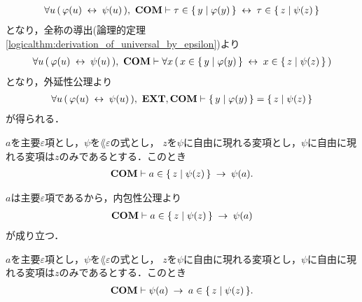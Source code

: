 \begin{sketch}
		\begin{align}
			\forall u\, (\, \varphi(u) \hspace{0.25em}\leftrightarrow\hspace{0.25em} \psi(u)\, ),\ \mbox{\bf COM} \vdash
			\tau \in \{\, y \mid \varphi(y)\, \} \hspace{0.25em}\leftrightarrow\hspace{0.25em} \tau \in \{\, z \mid \psi(z)\, \}
		\end{align}
		となり，全称の導出(論理的定理\ref{logicalthm:derivation_of_universal_by_epsilon})より
		\begin{align}
			\forall u\, (\, \varphi(u) \hspace{0.25em}\leftrightarrow\hspace{0.25em} \psi(u)\, ),\ \mbox{\bf COM} \vdash
			\forall x\, (\, x \in \{\, y \mid \varphi(y)\, \} \hspace{0.25em}\leftrightarrow\hspace{0.25em} x \in \{\, z \mid \psi(z)\, \}\, )
		\end{align}
		となり，外延性公理より
		\begin{align}
			\forall u\, (\, \varphi(u) \lrarrow \psi(u)\, ),\ \EXTAX,\COMAX \vdash
			\Set{y}{\varphi(y)} = \Set{z}{\psi(z)}
		\end{align}
		が得られる．
		\QED
	\end{sketch}
	
	\begin{screen}
		\begin{thm}
		\label{thm:equivalent_formula_rewriting_7}
			$a$を主要$\varepsilon$項とし，$\psi$を$\lang{\varepsilon}$の式とし，
			$z$を$\psi$に自由に現れる変項とし，$\psi$に自由に現れる変項は$z$のみであるとする．このとき
			\begin{align}
				\mbox{\bf COM} \vdash a \in \{\, z \mid \psi(z)\, \} \hspace{0.25em}\rightarrow\hspace{0.25em} \psi(a).
			\end{align}
		\end{thm}
	\end{screen}
	
	\begin{sketch}
		$a$は主要$\varepsilon$項であるから，内包性公理より
		\begin{align}
			\mbox{\bf COM} \vdash a \in \{\, z \mid \psi(z)\, \} \hspace{0.25em}\rightarrow\hspace{0.25em} \psi(a)
		\end{align}
		が成り立つ．
		\QED
	\end{sketch}
	
	\begin{screen}
		\begin{thm}
		\label{thm:equivalent_formula_rewriting_8}
			$a$を主要$\varepsilon$項とし，$\psi$を$\lang{\varepsilon}$の式とし，
			$z$を$\psi$に自由に現れる変項とし，$\psi$に自由に現れる変項は$z$のみであるとする．このとき
			\begin{align}
				\mbox{\bf COM} \vdash \psi(a) \hspace{0.25em}\rightarrow\hspace{0.25em} a \in \{\, z \mid \psi(z)\, \}.
			\end{align}
		\end{thm}
	\end{screen}
	
